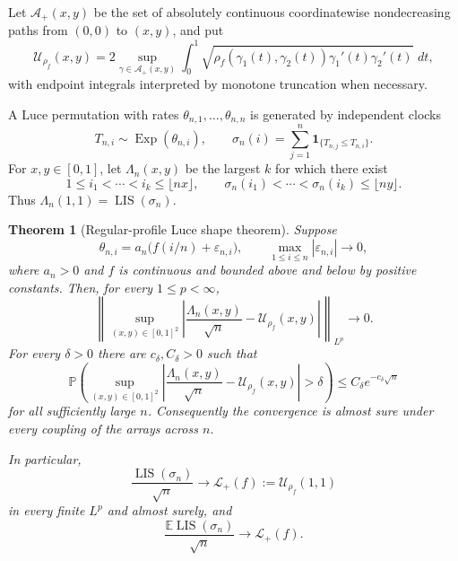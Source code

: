 \documentclass[11pt]{article}
\newtheorem{theorem}{Theorem}[section]
\theoremstyle{remark}
\newcommand{\Pp}{\mathbb P}
\newcommand{\Ee}{\mathbb E}
\newcommand{\one}{\mathbf 1}
\newcommand{\Exp}{\operatorname{Exp}}
\newcommand{\LIS}{\operatorname{LIS}}
\newcommand{\dd}{\,d}
\newcommand{\eps}{\varepsilon}
\newcommand{\calA}{\mathcal A}
\newcommand{\calL}{\mathcal L}
\newcommand{\calU}{\mathcal U}
\newcommand{\norm}[1]{\left\lVert #1\right\rVert}
\newcommand{\abs}[1]{\left|#1\right|}
\begin{document}
Let $\calA_+(x,y)$ be the set of absolutely continuous coordinatewise
nondecreasing paths from $(0,0)$ to $(x,y)$, and put
\begin{equation}\label{eq:Lrho-intro}
 \calU_{\rho_f}(x,y)
 =2\sup_{\gamma\in\calA_+(x,y)}
   \int_0^1
   \sqrt{\rho_f(\gamma_1(t),\gamma_2(t))
          \gamma_1'(t)\gamma_2'(t)}\,\dd t,
\end{equation}
with endpoint integrals interpreted by monotone truncation when necessary.

A Luce permutation with rates $\theta_{n,1},\dots,\theta_{n,n}$ is generated
by independent clocks
\[
        T_{n,i}\sim\Exp(\theta_{n,i}),
        \qquad
        \sigma_n(i)=\sum_{j=1}^n\one_{\{T_{n,j}\le T_{n,i}\}}.
\]
For $x,y\in[0,1]$, let $\Lambda_n(x,y)$ be the largest $k$ for which there
exist
\[
        1\le i_1<\cdots<i_k\le\lfloor nx\rfloor,
        \qquad
        \sigma_n(i_1)<\cdots<\sigma_n(i_k)\le\lfloor ny\rfloor.
\]
Thus $\Lambda_n(1,1)=\LIS(\sigma_n)$.

\begin{theorem}[Regular-profile Luce shape theorem]\label{thm:main-luce}
Suppose
\begin{equation}\label{eq:uniform-profile-hyp}
        \theta_{n,i}=a_n\bigl(f(i/n)+\eps_{n,i}\bigr),
        \qquad
        \max_{1\le i\le n}|\eps_{n,i}|\longrightarrow0,
\end{equation}
where $a_n>0$ and $f$ is continuous and bounded above and below by positive
constants.  Then, for every $1\le p<\infty$,
\begin{equation}\label{eq:main-shape-conv}
 \norm{
    \sup_{(x,y)\in[0,1]^2}
    \abs{\frac{\Lambda_n(x,y)}{\sqrt n}
          -\calU_{\rho_f}(x,y)}
 }_{L^p}
 \longrightarrow0.
\end{equation}
For every $\delta>0$ there are $c_\delta,C_\delta>0$ such that
\begin{equation}\label{eq:main-exp-conc}
 \Pp\left(
    \sup_{(x,y)\in[0,1]^2}
    \abs{\frac{\Lambda_n(x,y)}{\sqrt n}
          -\calU_{\rho_f}(x,y)}>\delta
 \right)
 \le C_\delta e^{-c_\delta\sqrt n}
\end{equation}
for all sufficiently large $n$.  Consequently the convergence is almost sure
under every coupling of the arrays across $n$.

In particular,
\begin{equation}\label{eq:main-lis-conv}
        \frac{\LIS(\sigma_n)}{\sqrt n}
        \longrightarrow
        \calL_+(f):=\calU_{\rho_f}(1,1)
\end{equation}
in every finite $L^p$ and almost surely, and
\[
        \frac{\Ee\LIS(\sigma_n)}{\sqrt n}
        \longrightarrow\calL_+(f).
\]
\end{theorem}
\end{document}
